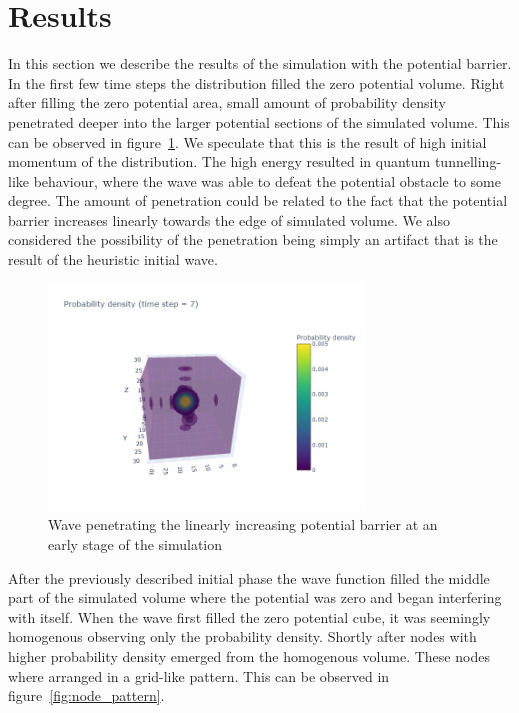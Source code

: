 \section{Results}
\label{sec:results}

In this section we describe the results of the simulation with the potential barrier.
In the first few time steps the distribution filled the zero potential volume.
Right after filling the zero potential area, small amount of probability density penetrated deeper into the larger potential sections of the simulated volume.
This can be observed in figure~\ref{fig:penetrating_potential}.
We speculate that this is the result of high initial momentum of the distribution.
The high energy resulted in quantum tunnelling-like behaviour, where the wave was able to defeat the potential obstacle to some degree.
The amount of penetration could be related to the fact that the potential barrier increases linearly towards the edge of simulated volume.
We also considered the possibility of the penetration being simply an artifact that is the result of the heuristic initial wave.

\begin{figure}
	\includegraphics[width=0.75\textwidth]{"figures/probability_density007.jpeg"}
	\caption{Wave penetrating the linearly increasing potential barrier at an early stage of the simulation}
	\label{fig:penetrating_potential}
\end{figure}

After the previously described initial phase the wave function filled the middle part of the simulated volume where the potential was zero and began interfering with itself.
When the wave first filled the zero potential cube, it was seemingly homogenous observing only the probability density.
Shortly after nodes with higher probability density emerged from the homogenous volume.
These nodes where arranged in a grid-like pattern.
This can be observed in figure~\ref{fig:node_pattern}.

